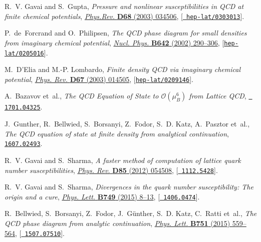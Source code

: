 \documentclass{PoS}
\begin{document}
\begin{thebibliography}{100}
R.~V. Gavai and S.~Gupta, \emph{{Pressure and nonlinear susceptibilities in QCD
  at finite chemical potentials}},
  \href{http://dx.doi.org/10.1103/PhysRevD.68.034506}{\emph{Phys.Rev.} {\bf
  D68} (2003) 034506}, [\href{https://arxiv.org/abs/hep-lat/0303013}{{\tt
  hep-lat/0303013}}].

P.~de~Forcrand and O.~Philipsen, \emph{{The QCD phase diagram for small
  densities from imaginary chemical potential}},
  \href{http://dx.doi.org/10.1016/S0550-3213(02)00626-0}{\emph{Nucl. Phys.}
  {\bf B642} (2002) 290--306},
  [\href{https://arxiv.org/abs/hep-lat/0205016}{{\tt hep-lat/0205016}}].

M.~D'Elia and M.-P. Lombardo, \emph{{Finite density QCD via imaginary chemical
  potential}}, \href{http://dx.doi.org/10.1103/PhysRevD.67.014505}{\emph{Phys.
  Rev.} {\bf D67} (2003) 014505},
  [\href{https://arxiv.org/abs/hep-lat/0209146}{{\tt hep-lat/0209146}}].

A.~Bazavov et~al., \emph{{The QCD Equation of State to $\mathcal{O}(\mu_B^6)$
  from Lattice QCD}},  \href{https://arxiv.org/abs/1701.04325}{{\tt
  1701.04325}}.

J.~Gunther, R.~Bellwied, S.~Borsanyi, Z.~Fodor, S.~D. Katz, A.~Pasztor et~al.,
  \emph{{The QCD equation of state at finite density from analytical
  continuation}},  \href{https://arxiv.org/abs/1607.02493}{{\tt 1607.02493}}.

R.~V. Gavai and S.~Sharma, \emph{{A faster method of computation of lattice
  quark number susceptibilities}},
  \href{http://dx.doi.org/10.1103/PhysRevD.85.054508}{\emph{Phys. Rev.} {\bf
  D85} (2012) 054508}, [\href{https://arxiv.org/abs/1112.5428}{{\tt
  1112.5428}}].

R.~V. Gavai and S.~Sharma, \emph{{Divergences in the quark number
  susceptibility: The origin and a cure}},
  \href{http://dx.doi.org/10.1016/j.physletb.2015.07.036}{\emph{Phys. Lett.}
  {\bf B749} (2015) 8--13}, [\href{https://arxiv.org/abs/1406.0474}{{\tt
  1406.0474}}].

R.~Bellwied, S.~Borsanyi, Z.~Fodor, J.~G{\"u}nther, S.~D. Katz, C.~Ratti
  et~al., \emph{{The QCD phase diagram from analytic continuation}},
  \href{http://dx.doi.org/10.1016/j.physletb.2015.11.011}{\emph{Phys. Lett.}
  {\bf B751} (2015) 559--564}, [\href{https://arxiv.org/abs/1507.07510}{{\tt
  1507.07510}}].


\end{thebibliography}
\end{document}
